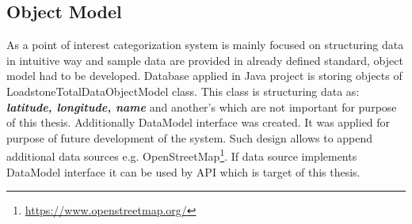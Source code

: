 \subsection{Object Model}
As a point of interest categorization system is mainly focused on structuring data in intuitive way and sample data are provided in already defined standard, object model had to be developed. Database applied in Java project is storing objects of LoadstoneTotalDataObjectModel class. This class is structuring data as: \textit{\textbf{latitude, longitude, name}} and another's which are not important for purpose of this thesis. Additionally DataModel interface was created. It was applied for purpose of future development of the system. Such design allows to append additional data sources e.g. OpenStreetMap\footnote{\url{https://www.openstreetmap.org/}}. If data source implements DataModel interface it can be used by API which is target of this thesis.      